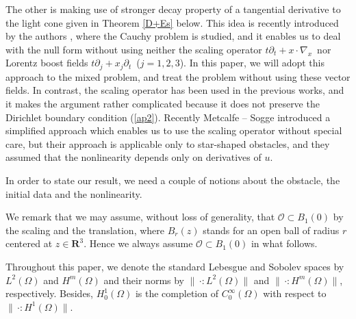 \documentclass[12pt]{amsart}
\newcommand{\R}{{\mathbf R}}
\numberwithin{equation}{section}
\begin{document}
The other is making use of stronger decay property of a tangential derivative 
to the light cone given in Theorem \ref{D+Es} below.
This idea is recently introduced by the authors \cite{KaKu07},
where the Cauchy problem is studied, and it enables us to deal with 
the null form
without using neither the scaling operator $t\partial_t+x\cdot\nabla_{\!x}\,$ nor Lorentz boost
fields $t \partial_j+x_j \partial_t$\ ($j=1,2,3$).
In this paper, 
we will adopt this approach 
to the mixed problem, and treat the problem without using these vector fields. 
In contrast, the scaling operator has been used in the previous works,
and it makes the argument rather complicated because it does not preserve the Dirichlet boundary condition (\ref{ap2}).
Recently Metcalfe -- Sogge \cite{MetSo07} introduced a simplified approach 
which enables us to use the scaling operator without special care, 
but their approach is applicable only to star-shaped obstacles,
and they assumed that the nonlinearity depends only on derivatives of $u$.



In order to state our result, we need a couple of notions about the obstacle,
the initial data and the nonlinearity.

We remark that we may assume, without loss of generality, that 
${\mathcal O}\subset B_{1}(0)$ by the
scaling and the translation,
where $B_r(z)$ stands for an open ball of
radius $r$ centered at $z \in \R^3$.
Hence we always assume ${\mathcal O}\subset B_1(0)$ in what follows.

Throughout this paper, we denote the standard Lebesgue
and Sobolev spaces by $L^2({\Omega})$ and $H^m({\Omega})$ 
and their norms by $\|\,\cdot : L^2({\Omega})\|$ and 
$\|\,\cdot : H^m({\Omega})\|$, respectively. 
Besides, $H^1_0(\Omega)$ is the completion of
$C^\infty_0({\Omega})$ with respect to $\|\,\cdot : H^1({\Omega})\|$.
\end{document}
